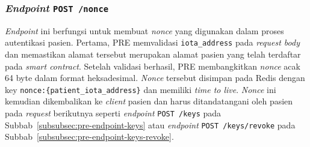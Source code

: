 

\subsubsection{\textit{Endpoint} \texttt{POST /nonce}}\label{subsubsec:pre-endpoint-nonce}

\textit{Endpoint} ini berfungsi untuk membuat \textit{nonce} yang digunakan dalam proses autentikasi pasien. 
Pertama, PRE memvalidasi \texttt{iota\_address} pada \textit{request body} dan memastikan alamat tersebut merupakan alamat pasien yang telah terdaftar pada \textit{smart contract}. 
Setelah validasi berhasil, PRE membangkitkan \textit{nonce} acak 64 byte dalam format heksadesimal. 
\textit{Nonce} tersebut disimpan pada Redis dengan key \texttt{nonce:\{patient\_iota\_address\}} dan memiliki \textit{time to live}. 
\textit{Nonce} ini kemudian dikembalikan ke \textit{client} pasien dan harus ditandatangani oleh pasien pada \textit{request} berikutnya seperti \textit{endpoint} \texttt{POST /keys} pada Subbab~\ref{subsubsec:pre-endpoint-keys} atau \textit{endpoint} \texttt{POST /keys/revoke} pada Subbab~\ref{subsubsec:pre-endpoint-keys-revoke}.

